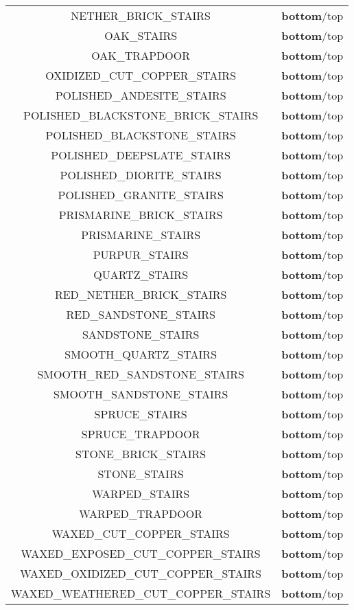 \begin{longtable}{ |c|c| }
	NETHER\_BRICK\_STAIRS & \textbf{bottom}/top \\
	OAK\_STAIRS & \textbf{bottom}/top \\
	OAK\_TRAPDOOR & \textbf{bottom}/top \\
	OXIDIZED\_CUT\_COPPER\_STAIRS & \textbf{bottom}/top \\
	POLISHED\_ANDESITE\_STAIRS & \textbf{bottom}/top \\
	POLISHED\_BLACKSTONE\_BRICK\_STAIRS & \textbf{bottom}/top \\
	POLISHED\_BLACKSTONE\_STAIRS & \textbf{bottom}/top \\
	POLISHED\_DEEPSLATE\_STAIRS & \textbf{bottom}/top \\
	POLISHED\_DIORITE\_STAIRS & \textbf{bottom}/top \\
	POLISHED\_GRANITE\_STAIRS & \textbf{bottom}/top \\
	PRISMARINE\_BRICK\_STAIRS & \textbf{bottom}/top \\
	PRISMARINE\_STAIRS & \textbf{bottom}/top \\
	PURPUR\_STAIRS & \textbf{bottom}/top \\
	QUARTZ\_STAIRS & \textbf{bottom}/top \\
	RED\_NETHER\_BRICK\_STAIRS & \textbf{bottom}/top \\
	RED\_SANDSTONE\_STAIRS & \textbf{bottom}/top \\
	SANDSTONE\_STAIRS & \textbf{bottom}/top \\
	SMOOTH\_QUARTZ\_STAIRS & \textbf{bottom}/top \\
	SMOOTH\_RED\_SANDSTONE\_STAIRS & \textbf{bottom}/top \\
	SMOOTH\_SANDSTONE\_STAIRS & \textbf{bottom}/top \\
	SPRUCE\_STAIRS & \textbf{bottom}/top \\
	SPRUCE\_TRAPDOOR & \textbf{bottom}/top \\
	STONE\_BRICK\_STAIRS & \textbf{bottom}/top \\
	STONE\_STAIRS & \textbf{bottom}/top \\
	WARPED\_STAIRS & \textbf{bottom}/top \\
	WARPED\_TRAPDOOR & \textbf{bottom}/top \\
	WAXED\_CUT\_COPPER\_STAIRS & \textbf{bottom}/top \\
	WAXED\_EXPOSED\_CUT\_COPPER\_STAIRS & \textbf{bottom}/top \\
	WAXED\_OXIDIZED\_CUT\_COPPER\_STAIRS & \textbf{bottom}/top \\
	WAXED\_WEATHERED\_CUT\_COPPER\_STAIRS & \textbf{bottom}/top \\

\end{longtable}
